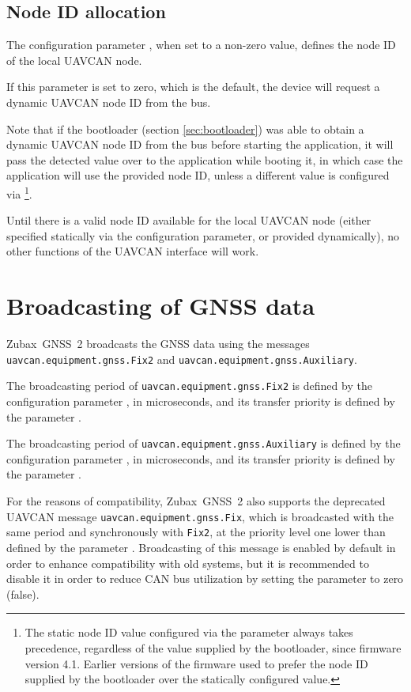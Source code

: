 \documentclass{zubaxdoc}
\begin{document}
\subsection{Node ID allocation}

The configuration parameter , when set to a non-zero value,
defines the node ID of the local UAVCAN node.

If this parameter is set to zero, which is the default, the device will request a dynamic UAVCAN node ID
from the bus.

Note that if the bootloader (section \ref{sec:bootloader}) was able to obtain a dynamic UAVCAN node ID
from the bus before starting the application,
it will pass the detected value over to the application while booting it,
in which case the application will use the provided node ID,
unless a different value is configured via
\footnote{The static node ID value configured via the parameter
always takes precedence, regardless of the value supplied by the bootloader, since firmware version 4.1.
Earlier versions of the firmware used to prefer the node ID supplied by the bootloader over the statically
configured value.}.

Until there is a valid node ID available for the local UAVCAN node (either specified
statically via the configuration parameter, or provided dynamically),
no other functions of the UAVCAN interface will work.

\section{Broadcasting  of GNSS data}

Zubax~GNSS~2 broadcasts the GNSS data using the messages
\verb|uavcan.equipment.gnss.Fix2| and \verb|uavcan.equipment.gnss.Auxiliary|.

The broadcasting period of \verb|uavcan.equipment.gnss.Fix2| is defined by the configuration
parameter , in microseconds, and its transfer priority is defined by the
parameter .

The broadcasting period of \verb|uavcan.equipment.gnss.Auxiliary| is defined by the configuration
parameter , in microseconds, and its transfer priority is defined by the
parameter .

For the reasons of compatibility, Zubax~GNSS~2 also supports the deprecated UAVCAN message
\verb|uavcan.equipment.gnss.Fix|, which is broadcasted with the same period and
synchronously with \verb|Fix2|, at the priority level one lower than
defined by the parameter .
Broadcasting of this message is enabled by default in order to enhance compatibility with old systems,
but it is recommended to disable it in order to reduce CAN bus utilization by setting
the parameter  to zero (false).
\end{document}
